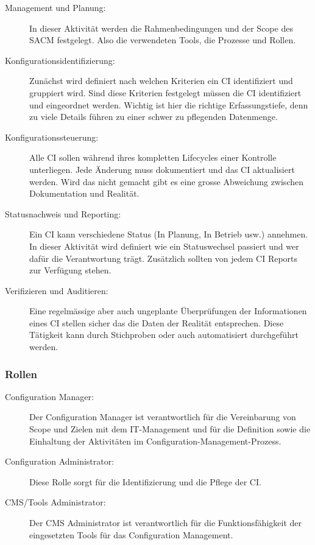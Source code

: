\begin{description}
	\item[Management und Planung:] In dieser Aktivität werden die Rahmenbedingungen und der Scope des SACM festgelegt. Also die verwendeten Tools, die Prozesse und Rollen.
	\item[Konfigurationsidentifizierung:] Zunächst wird definiert nach welchen Kriterien ein CI identifiziert und gruppiert wird. Sind diese Kriterien festgelegt müssen die CI identifiziert und eingeordnet werden. Wichtig ist hier die richtige Erfassungstiefe, denn zu viele Details führen zu einer schwer zu pflegenden Datenmenge.
	\item[Konfigurationssteuerung:] Alle CI sollen während ihres kompletten Lifecycles einer Kontrolle unterliegen. Jede Änderung muss dokumentiert und das CI aktualisiert werden. Wird das nicht gemacht gibt es eine grosse Abweichung zwischen Dokumentation und Realität.
	\item[Statusnachweis und Reporting:] Ein CI kann verschiedene Status (In Planung, In Betrieb usw.) annehmen. In dieser Aktivität wird definiert wie ein Statuswechsel passiert und wer dafür die Verantwortung trägt. Zusätzlich sollten von jedem CI Reports zur Verfügung stehen.
	\item[Verifizieren und Auditieren:] Eine regelmässige aber auch ungeplante Überprüfungen der Informationen eines CI stellen sicher das die Daten der Realität entsprechen. Diese Tätigkeit kann durch Stichproben oder auch automatisiert durchgeführt werden.
\end{description}

\subsubsection{Rollen}

\begin{description}
	\item[Configuration Manager:] Der Configuration Manager ist verantwortlich für die Vereinbarung von Scope und Zielen mit dem IT-Management und für die Definition sowie die Einhaltung der Aktivitäten im Configuration-Management-Prozess.
	\item[Configuration Administrator:] Diese Rolle sorgt für die Identifizierung und die Pflege der CI.
	\item[CMS/Tools Administrator:] Der CMS Administrator ist verantwortlich für die Funktionsfähigkeit der eingesetzten Tools für das Configuration Management.
\end{description}


